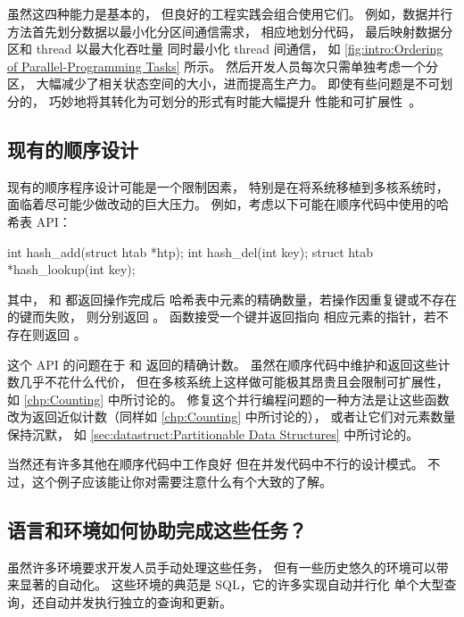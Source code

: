 虽然这四种能力是基本的，
但良好的工程实践会组合使用它们。
例如，数据并行方法首先划分数据以最小化分区间通信需求，
相应地划分代码，
最后映射数据分区和 thread 以最大化吞吐量
同时最小化 thread 间通信，
如 \cref{fig:intro:Ordering of Parallel-Programming Tasks} 所示。
然后开发人员每次只需单独考虑一个分区，
大幅减少了相关状态空间的大小，进而提高生产力。
即使有些问题是不可划分的，
巧妙地将其转化为可划分的形式有时能大幅提升
性能和可扩展性~\cite{PanagiotisMetaxas1999PDCS}。

\subsection{现有的顺序设计}
\label{sec:intro:Existing Sequential Designs}

现有的顺序程序设计可能是一个限制因素，
特别是在将系统移植到多核系统时，
面临着尽可能少做改动的巨大压力。
例如，考虑以下可能在顺序代码中使用的哈希表 API：

\begin{VerbatimU}
int hash_add(struct htab *htp);
int hash_del(int key);
struct htab *hash_lookup(int key);
\end{VerbatimU}

其中， 和  都返回操作完成后
哈希表中元素的精确数量，若操作因重复键或不存在的键而失败，
则分别返回 。
 函数接受一个键并返回指向
相应元素的指针，若不存在则返回 。

这个 API 的问题在于  和  返回的精确计数。
虽然在顺序代码中维护和返回这些计数几乎不花什么代价，
但在多核系统上这样做可能极其昂贵且会限制可扩展性，
如 \cref{chp:Counting} 中所讨论的。
修复这个并行编程问题的一种方法是让这些函数
改为返回近似计数（同样如 \cref{chp:Counting} 中所讨论的），
或者让它们对元素数量保持沉默，
如 \cref{sec:datastruct:Partitionable Data Structures} 中所讨论的。

当然还有许多其他在顺序代码中工作良好
但在并发代码中不行的设计模式。
不过，这个例子应该能让你对需要注意什么有个大致的了解。

\subsection{语言和环境如何协助完成这些任务？}
\label{sec:intro:How Do Languages and Environments Assist With These Tasks?}

虽然许多环境要求开发人员手动处理这些任务，
但有一些历史悠久的环境可以带来显著的自动化。
这些环境的典范是 SQL，它的许多实现自动并行化
单个大型查询，还自动并发执行独立的查询和更新。

